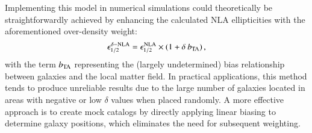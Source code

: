 Implementing this model  in numerical simulations could theoretically be straightforwardly achieved  by enhancing the calculated NLA ellipticities with the aforementioned over-density weight:
\begin{eqnarray}
\epsilon_{1/2}^{\delta-\rm NLA} = \epsilon_{1/2}^{\rm NLA}\times(1 + \delta \: b_{\rm TA}) \, ,
\label{eq:tidal_th_deltaNLA}
\end{eqnarray}
with the term $b_{\rm TA}$ representing the (largely undetermined) bias relationship between galaxies and the local matter field.
In practical applications, this method tends to produce unreliable results due to the large number of galaxies located in areas with negative or low $\delta$ values when placed randomly.
A more effective approach is to create mock catalogs by directly applying linear biasing to determine galaxy positions, which eliminates the need for subsequent weighting.

